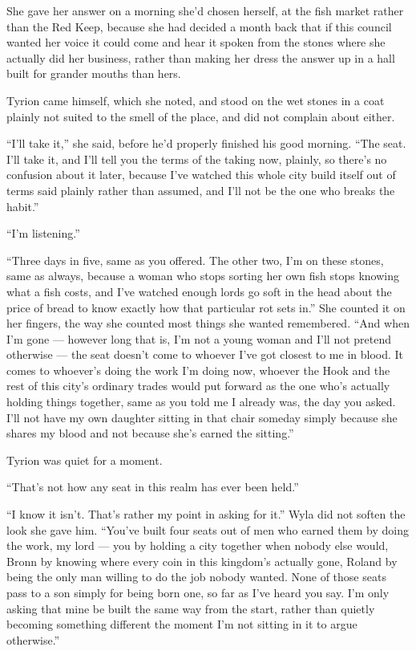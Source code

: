 She gave her answer on a morning she’d chosen herself, at the fish market rather than the Red Keep, because she had decided a month back that if this council wanted her voice it could come and hear it spoken from the stones where she actually did her business, rather than making her dress the answer up in a hall built for grander mouths than hers.

Tyrion came himself, which she noted, and stood on the wet stones in a coat plainly not suited to the smell of the place, and did not complain about either.

“I’ll take it,” she said, before he’d properly finished his good morning. “The seat. I’ll take it, and I’ll tell you the terms of the taking now, plainly, so there’s no confusion about it later, because I’ve watched this whole city build itself out of terms said plainly rather than assumed, and I’ll not be the one who breaks the habit.”

“I’m listening.”

\sceneBreak

“Three days in five, same as you offered. The other two, I’m on these stones, same as always, because a woman who stops sorting her own fish stops knowing what a fish costs, and I’ve watched enough lords go soft in the head about the price of bread to know exactly how that particular rot sets in.” She counted it on her fingers, the way she counted most things she wanted remembered. “And when I’m gone — however long that is, I’m not a young woman and I’ll not pretend otherwise — the seat doesn’t come to whoever I’ve got closest to me in blood. It comes to whoever’s doing the work I’m doing now, whoever the Hook and the rest of this city’s ordinary trades would put forward as the one who’s actually holding things together, same as you told me I already was, the day you asked. I’ll not have my own daughter sitting in that chair someday simply because she shares my blood and not because she’s earned the sitting.”

Tyrion was quiet for a moment.

“That’s not how any seat in this realm has ever been held.”

“I know it isn’t. That’s rather my point in asking for it.” Wyla did not soften the look she gave him. “You’ve built four seats out of men who earned them by doing the work, my lord — you by holding a city together when nobody else would, Bronn by knowing where every coin in this kingdom’s actually gone, Roland by being the only man willing to do the job nobody wanted. None of those seats pass to a son simply for being born one, so far as I’ve heard you say. I’m only asking that mine be built the same way from the start, rather than quietly becoming something different the moment I’m not sitting in it to argue otherwise.”

